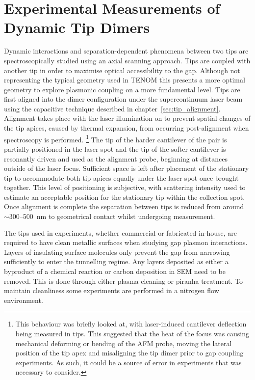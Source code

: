\documentclass[a4paper]{article}
\begin{document}
\section{Experimental Measurements of Dynamic Tip Dimers}

Dynamic interactions and separation-dependent phenomena between two tips are spectroscopically studied using an axial scanning approach. Tips are coupled with another tip in order to maximise optical accessibility to the gap. Although not representing the typical geometry used in TENOM this presents a more optimal geometry to explore plasmonic coupling on a more fundamental level.
Tips are first aligned into the dimer configuration under the supercontinuum laser beam using the capacitive technique described in chapter~\ref{sec:tip_alignment}. Alignment takes place with the laser illumination on to prevent spatial changes of the tip apices, caused by thermal expansion, from occurring post-alignment when spectroscopy is performed.%
\footnote{This behaviour was briefly looked at, with laser-induced cantilever deflection being measured in tips. This suggested that the heat of the focus was causing mechanical deforming or bending of the AFM probe, moving the lateral position of the tip apex and misaligning the tip dimer prior to gap coupling experiments. As such, it could be a source of error in experiments that was necessary to consider.}
The tip of the harder cantilever of the pair is partially positioned in the laser spot and the tip of the softer cantilever is resonantly driven and used as the alignment probe, beginning at distances outside of the laser focus. Sufficient space is left after placement of the stationary tip to accommodate both tip apices equally under the laser spot once brought together. This level of positioning is subjective, with scattering intensity used to estimate an acceptable position for the stationary tip within the collection spot. Once alignment is complete the separation between tips is reduced from around $\sim$300--\SI{500}{nm} to geometrical contact whilst undergoing measurement.

The tips used in experiments, whether commercial or fabricated in-house, are required to have clean metallic surfaces when studying gap plasmon interactions. Layers of insulating surface molecules only prevent the gap from narrowing sufficiently to enter the tunnelling regime. Any layers deposited as either a byproduct of a chemical reaction or carbon deposition in SEM need to be removed. This is done through either plasma cleaning or piranha treatment. To maintain cleanliness some experiments are performed in a nitrogen flow environment.
\end{document}
